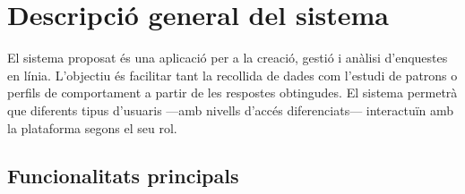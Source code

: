 \documentclass[../main.tex]{subfiles}
\begin{document}
\section{Descripció general del sistema}

El sistema proposat és una aplicació per a la creació, gestió i anàlisi d’enquestes en línia. 
L’objectiu és facilitar tant la recollida de dades com l’estudi de patrons o perfils de comportament 
a partir de les respostes obtingudes.  
El sistema permetrà que diferents tipus d’usuaris —amb nivells d’accés diferenciats— 
interactuïn amb la plataforma segons el seu rol.

\subsection{Funcionalitats principals}
\end{document}
